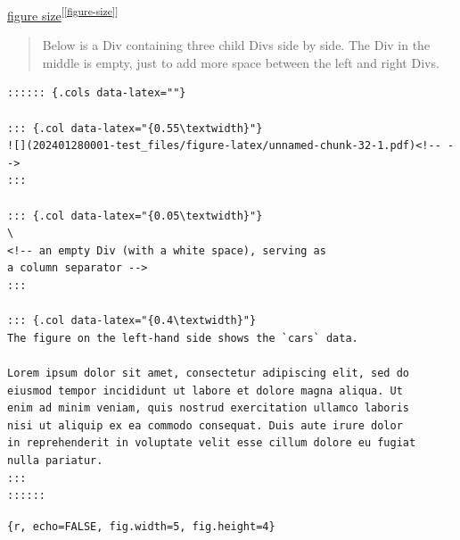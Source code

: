 \documentclass[
]{book}
\theoremstyle{definition}
\theoremstyle{definition}
\theoremstyle{definition}
\theoremstyle{definition}
\theoremstyle{remark}
\begin{document}
\protect\hyperlink{figure-size}{figure size}\textsuperscript{{[}\ref{figure-size}{]}}

\begin{quote}
Below is a Div containing three child Divs side by side. The Div in the middle is empty, just to add more space between the left and right Divs.
\end{quote}

\begin{verbatim}
:::::: {.cols data-latex=""}

::: {.col data-latex="{0.55\textwidth}"}
![](202401280001-test_files/figure-latex/unnamed-chunk-32-1.pdf)<!-- --> 
:::

::: {.col data-latex="{0.05\textwidth}"}
\ 
<!-- an empty Div (with a white space), serving as
a column separator -->
:::

::: {.col data-latex="{0.4\textwidth}"}
The figure on the left-hand side shows the `cars` data.

Lorem ipsum dolor sit amet, consectetur adipiscing elit, sed do
eiusmod tempor incididunt ut labore et dolore magna aliqua. Ut
enim ad minim veniam, quis nostrud exercitation ullamco laboris
nisi ut aliquip ex ea commodo consequat. Duis aute irure dolor
in reprehenderit in voluptate velit esse cillum dolore eu fugiat
nulla pariatur.
:::
::::::
\end{verbatim}

\texttt{\{r,\ echo=FALSE,\ fig.width=5,\ fig.height=4\}}
\end{document}
